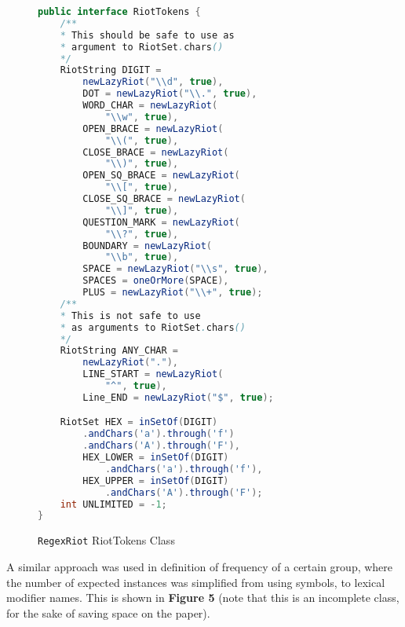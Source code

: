 \documentclass[conference]{IEEEtran}
\begin{document}
\begin{figure}[htbp]
    \centering
    \label{fig:regexriot-riot-tokens}
    \begin{lstlisting}[language=Java]
public interface RiotTokens {
    /**
    * This should be safe to use as 
    * argument to RiotSet.chars()
    */
    RiotString DIGIT = 
        newLazyRiot("\\d", true),
        DOT = newLazyRiot("\\.", true),
        WORD_CHAR = newLazyRiot(
            "\\w", true),
        OPEN_BRACE = newLazyRiot(
            "\\(", true),
        CLOSE_BRACE = newLazyRiot(
            "\\)", true),
        OPEN_SQ_BRACE = newLazyRiot(
            "\\[", true),
        CLOSE_SQ_BRACE = newLazyRiot(
            "\\]", true),
        QUESTION_MARK = newLazyRiot(
            "\\?", true),
        BOUNDARY = newLazyRiot(
            "\\b", true),
        SPACE = newLazyRiot("\\s", true),
        SPACES = oneOrMore(SPACE),
        PLUS = newLazyRiot("\\+", true);
    /**
    * This is not safe to use
    * as arguments to RiotSet.chars()
    */
    RiotString ANY_CHAR = 
        newLazyRiot("."),
        LINE_START = newLazyRiot(
            "^", true),
        Line_END = newLazyRiot("$", true);

    RiotSet HEX = inSetOf(DIGIT)
        .andChars('a').through('f')
        .andChars('A').through('F'),
        HEX_LOWER = inSetOf(DIGIT)
            .andChars('a').through('f'),
        HEX_UPPER = inSetOf(DIGIT)
            .andChars('A').through('F');
    int UNLIMITED = -1;
}
    \end{lstlisting}
    \caption{\texttt{RegexRiot} RiotTokens Class}
\end{figure}

\vfill\eject

A similar approach was used in definition of frequency of a certain group,
where the number of expected instances was simplified from using symbols,
to lexical modifier names. This is shown in \textbf{Figure 5} 
(note that this is an incomplete class, for the sake of saving space 
on the paper).
\end{document}
